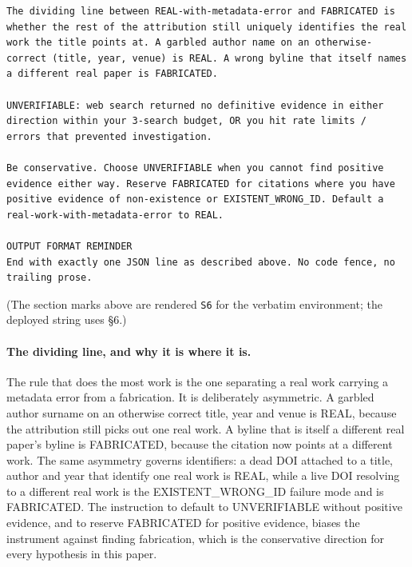 \begin{small}
\begin{verbatim}
The dividing line between REAL-with-metadata-error and FABRICATED is
whether the rest of the attribution still uniquely identifies the real
work the title points at. A garbled author name on an otherwise-
correct (title, year, venue) is REAL. A wrong byline that itself names
a different real paper is FABRICATED.

UNVERIFIABLE: web search returned no definitive evidence in either
direction within your 3-search budget, OR you hit rate limits /
errors that prevented investigation.

Be conservative. Choose UNVERIFIABLE when you cannot find positive
evidence either way. Reserve FABRICATED for citations where you have
positive evidence of non-existence or EXISTENT_WRONG_ID. Default a
real-work-with-metadata-error to REAL.

OUTPUT FORMAT REMINDER
End with exactly one JSON line as described above. No code fence, no
trailing prose.
\end{verbatim}
\end{small}

\noindent(The section marks above are rendered \texttt{S6} for the verbatim
environment; the deployed string uses §6.)

\paragraph{The dividing line, and why it is where it is.}
The rule that does the most work is the one separating a real work carrying a
metadata error from a fabrication. It is deliberately asymmetric. A garbled
author surname on an otherwise correct title, year and venue is REAL, because
the attribution still picks out one real work. A byline that is itself a
different real paper's byline is FABRICATED, because the citation now points at
a different work. The same asymmetry governs identifiers: a dead DOI attached to
a title, author and year that identify one real work is REAL, while a live DOI
resolving to a different real work is the EXISTENT\_WRONG\_ID failure mode and
is FABRICATED. The instruction to default to UNVERIFIABLE without positive
evidence, and to reserve FABRICATED for positive evidence, biases the instrument
against finding fabrication, which is the conservative direction for every
hypothesis in this paper.


